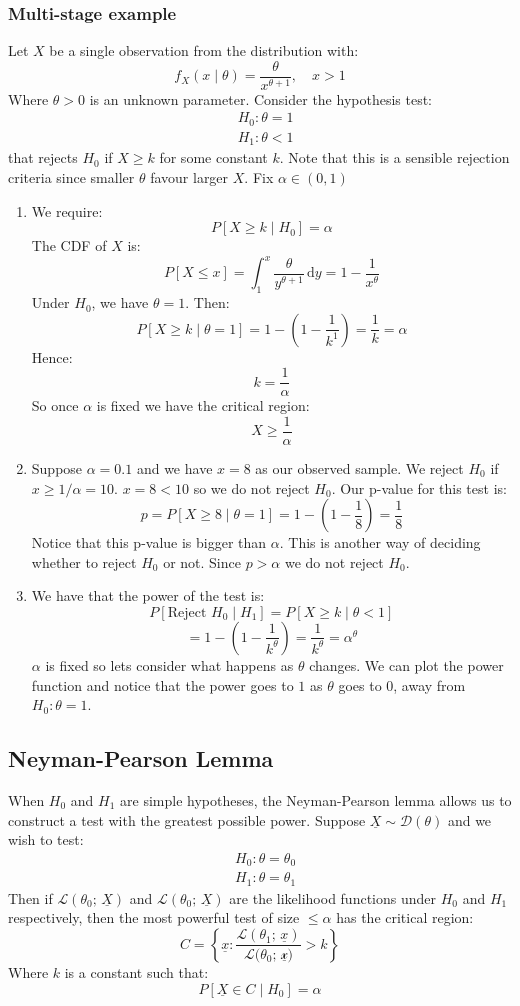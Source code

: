 \documentclass[12pt]{article}
\begin{document}
\subsubsection{Multi-stage example}
Let \(X\) be a single observation from the distribution with:
\[f_X(x\mid\theta)=\frac{\theta}{x^{\theta+1}},\quad x>1\]
Where \(\theta>0\) is an unknown parameter. Consider the hypothesis test:
\begin{align*}
    &H_0: \theta=1 \\
    &H_1:\theta<1
\end{align*}
that rejects \(H_0\) if \(X\geq k\) for some constant \(k\). Note that this is a sensible rejection criteria since smaller \(\theta\) favour larger \(X\). Fix \(\alpha\in(0,1)\)
\begin{enumerate}
    \item[a)] We require:
    \[P[X\geq k\mid H_0]=\alpha\]
    The CDF of \(X\) is:
    \[P[X\leq x]=\int^x_1\frac{\theta}{y^{\theta+1}}\,\text{d}y=1-\frac{1}{x^\theta}\]
    Under \(H_0\), we have \(\theta=1\). Then:
    \[P[X\geq k\mid \theta=1]=1-\left(1-\frac{1}{k^1}\right)=\frac{1}{k}=\alpha\]
    Hence:
    \[k=\frac{1}{\alpha}\]
    So once \(\alpha\) is fixed we have the critical region:
    \[X\geq \frac{1}{\alpha}\]
    \item[b)] Suppose \(\alpha=0.1\) and we have \(x=8\) as our observed sample. We reject \(H_0\) if \(x\geq 1/\alpha=10\). \(x=8<10\) so we do not reject \(H_0\). Our p-value for this test is:
    \[p=P[X\geq 8\mid\theta=1]=1-\left(1-\frac{1}{8}\right)=\frac{1}{8}\]
    Notice that this p-value is bigger than \(\alpha\). This is another way of deciding whether to reject \(H_0\) or not. Since \(p>\alpha\) we do not reject \(H_0\).
    \item[c)] We have that the power of the test is:
    \[P[\text{Reject }H_0\mid H_1]=P[X\geq k\mid \theta<1]\]
    \[=1-\left(1-\frac{1}{k^{\theta}}\right)=\frac{1}{k^\theta}=\alpha^\theta\]
    \(\alpha\) is fixed so lets consider what happens as \(\theta\) changes. We can plot the power function and notice that the power goes to \(1\) as \(\theta\) goes to 0, away from \(H_0:\theta=1\).
\end{enumerate}
\subsection{Neyman-Pearson Lemma}
When \(H_0\) and \(H_1\) are simple hypotheses, the Neyman-Pearson lemma allows us to construct a test with the greatest possible power. Suppose \(\underline{X}\sim \mathcal{D}(\theta)\) and we wish to test:
\begin{align*}
    &H_0: \theta=\theta_0 \\
    &H_1:\theta=\theta_1
\end{align*}
Then if \(\mathcal{L}(\theta_0;\,\underline{X})\) and \(\mathcal{L}(\theta_0;\,\underline{X})\) are the likelihood functions under \(H_0\) and \(H_1\) respectively, then the most powerful test of size \(\leq \alpha\) has the critical region:
\[C=\left\{\underline{x}:\frac{\mathcal{L}(\theta_1;\,\underline{x})}{\mathcal{L(\theta_0;\,\underline{x}})}>k\right\}\]
Where \(k\) is a constant such that:
\[P[\underline{X}\in C\mid H_0]=\alpha\]
\end{document}
